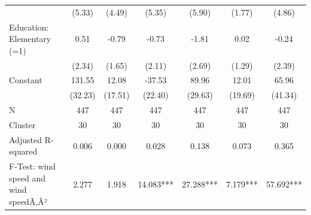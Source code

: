{\begin{tabular}{l*{6}{c}}
                    &      (5.33)         &      (4.49)         &      (5.35)         &      (5.90)         &      (1.77)         &      (4.86)         \\
Education: Elementary (=1)&        0.51         &       -0.79         &       -0.73         &       -1.81         &        0.02         &       -0.24         \\
                    &      (2.34)         &      (1.65)         &      (2.11)         &      (2.69)         &      (1.29)         &      (2.39)         \\
Constant            &      131.55\sym{***}&       12.08         &      -37.53         &       89.96\sym{***}&       12.01         &       65.96         \\
                    &     (32.23)         &     (17.51)         &     (22.40)         &     (29.63)         &     (19.69)         &     (41.34)         \\
\midrule
N                   &         447         &         447         &         447         &         447         &         447         &         447         \\
Cluster             &          30         &          30         &          30         &          30         &          30         &          30         \\
Adjusted R-squared  &       0.006         &       0.000         &       0.028         &       0.138         &       0.073         &       0.365         \\
F-Test: wind speed and wind speedÃ‚Â²&       2.277         &       1.918         &   14.083***         &   27.288***         &    7.179***         &   57.692***         \\
\bottomrule
\end{tabular}
}
